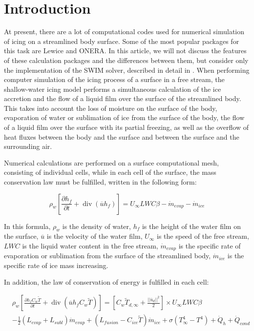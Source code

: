 \documentclass[
11pt,%
tightenlines,%
twoside,%
onecolumn,%
nofloats,%
nobibnotes,%
nofootinbib,%
superscriptaddress,%
noshowpacs,%
centertags]%
{revtex4}
\begin{document}
\section{Introduction}

At present, there are a lot of computational codes used for numerical simulation of icing on a streamlined body surface.
Some of the most popular packages for this task are Lewice \cite{Wright} and ONERA.
In this article, we will not discuss the features of these calculation packages and the differences between them, but consider only the implementation of the SWIM solver, described in detail in \cite{Bourgault}.
When performing computer simulation of the icing process of a surface in a free stream, the shallow-water icing model performs a simultaneous calculation of the ice accretion and the flow of a liquid film over the surface of the streamlined body. This takes into account the loss of moisture on the surface of the body, evaporation of water or sublimation of ice from the surface of the body, the flow of a liquid film over the surface with its partial freezing, as well as the overflow of heat fluxes between the body and the surface and between the surface and the surrounding air.

Numerical calculations are performed on a surface computational mesh, consisting of individual cells, while in each cell of the surface, the mass conservation law must be fulfilled, written in the following form:

\begin{equation}
\rho_w \left[ \frac{\partial h_f}{\partial t} + \operatorname{div}(\overline{u} h_f) \right] = U_{\infty} LWC \beta - \dot m_{evap} - \dot m_{ice}
\end{equation}

In this formula, $\rho_w$ is the density of water, $h_f$ is the height of the water film on the surface, $\overline{u}$ is the velocity of the water film, $U_{\infty}$ is the speed of the free stream, $LWC$ is the liquid water content in the free stream, $\dot m_{evap}$ is the specific rate of evaporation or sublimation from the surface of the streamlined body, $\dot m_{ice}$ is the specific rate of ice mass increasing.

In addition, the law of conservation of energy is fulfilled in each cell:

\begin{equation}
\begin{aligned}
& \rho_w \left[ \frac{\partial h_f C_w \tilde{T}}{\partial t} + \operatorname{div}(\overline{u} h_f C_w \tilde{T}) \right] = \left[ C_w \tilde{T}_{d,\infty} + \frac{||\overline{u}_d||^2}{2} \right] \times U_{\infty} LWC \beta
\\
& - \frac{1}{2}(L_{evap} + L_{subl}) \dot m_{evap} + (L_{fusion} - C_{ice} \tilde{T}) \dot m_{ice} + \sigma (T_{\infty}^4 - T^4) + \dot Q_h + \dot Q_{cond}
\end{aligned}
\end{equation}
\end{document}
